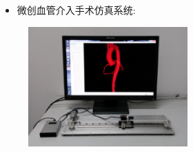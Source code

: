 \begin{frame}
\begin{itemize}
  \item 微创血管介入手术仿真系统: 
\end{itemize}
\begin{figure}[t]
\centering
\includegraphics[height=130pt]{../../Figures/background/simulator.eps}
\end{figure}
% 
\end{frame}

